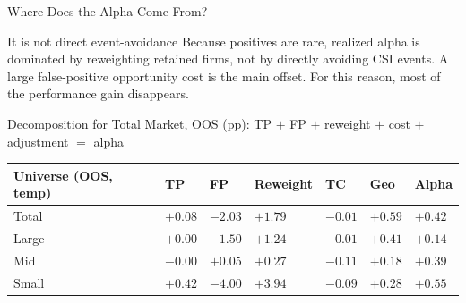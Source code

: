 \documentclass[10pt]{beamer}\usepackage[]{graphicx}\usepackage[table]{xcolor}
\begin{document}
\begin{frame}{Where Does the Alpha Come From?}
\scriptsize

\begin{alertblock}{It is not direct event-avoidance}
\scriptsize
Because positives are rare, realized alpha is dominated by reweighting retained firms, not by directly avoiding CSI events. A large false-positive opportunity cost is the main offset. For this reason, most of the performance gain disappears.
\end{alertblock}

\vspace{0.2em}
{\scriptsize Decomposition for Total Market, OOS (pp): TP $+$ FP $+$ reweight $+$ cost $+$ adjustment $=$ alpha}\\[2pt]
\begin{center}
\end{center}

\vspace{0.2em}
\begin{table}[ht]
\centering
\setlength{\tabcolsep}{5pt}\renewcommand{\arraystretch}{1.15}
\begin{tabular}{L{3.0cm}R{1.0cm}R{1.0cm}R{1.4cm}R{1.0cm}R{1.0cm}R{1.1cm}}
\toprule
Universe (OOS, temp) & TP & FP & Reweight & TC & Geo & Alpha \\
\midrule
Total & $+0.08$ & \textcolor{negred}{$-2.03$} & \textcolor{posgreen}{$+1.79$} & $-0.01$ & $+0.59$ & $\mathbf{+0.42}$ \\
Large & $+0.00$ & \textcolor{negred}{$-1.50$} & \textcolor{posgreen}{$+1.24$} & $-0.01$ & $+0.41$ & $\mathbf{+0.14}$ \\
Mid   & $-0.00$ & $+0.05$ & \textcolor{posgreen}{$+0.27$} & $-0.11$ & $+0.18$ & $\mathbf{+0.39}$ \\
Small & \textcolor{posgreen}{$+0.42$} & \textcolor{negred}{$-4.00$} & \textcolor{posgreen}{$+3.94$} & $-0.09$ & $+0.28$ & $\mathbf{+0.55}$ \\
\bottomrule
\end{tabular}
\end{table}
\end{frame}
\end{document}
